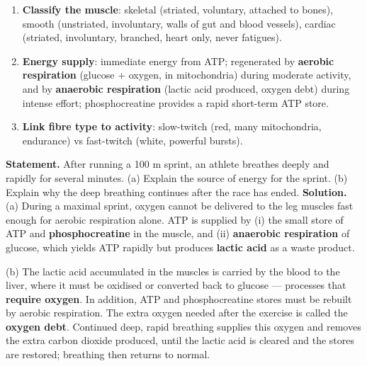 \documentclass[11pt]{article}
\begin{document}
\begin{methode}
\begin{enumerate}
\item \textbf{Classify the muscle}: skeletal (striated, voluntary, attached to bones), smooth (unstriated, involuntary, walls of gut and blood vessels), cardiac (striated, involuntary, branched, heart only, never fatigues).
\item \textbf{Energy supply}: immediate energy from ATP; regenerated by \textbf{aerobic respiration} (glucose + oxygen, in mitochondria) during moderate activity, and by \textbf{anaerobic respiration} (lactic acid produced, oxygen debt) during intense effort; phosphocreatine provides a rapid short-term ATP store.
\item \textbf{Link fibre type to activity}: slow-twitch (red, many mitochondria, endurance) vs fast-twitch (white, powerful bursts).
\end{enumerate}
\end{methode}

\begin{exoresolu}
\textbf{Statement.} After running a 100 m sprint, an athlete breathes deeply and rapidly for several minutes. (a) Explain the source of energy for the sprint. (b) Explain why the deep breathing continues after the race has ended.
\tcblower
\textbf{Solution.}
(a) During a maximal sprint, oxygen cannot be delivered to the leg muscles fast enough for aerobic respiration alone. ATP is supplied by (i) the small store of ATP and \textbf{phosphocreatine} in the muscle, and (ii) \textbf{anaerobic respiration} of glucose, which yields ATP rapidly but produces \textbf{lactic acid} as a waste product.

(b) The lactic acid accumulated in the muscles is carried by the blood to the liver, where it must be oxidised or converted back to glucose --- processes that \textbf{require oxygen}. In addition, ATP and phosphocreatine stores must be rebuilt by aerobic respiration. The extra oxygen needed after the exercise is called the \textbf{oxygen debt}. Continued deep, rapid breathing supplies this oxygen and removes the extra carbon dioxide produced, until the lactic acid is cleared and the stores are restored; breathing then returns to normal.
\end{exoresolu}
\end{document}
